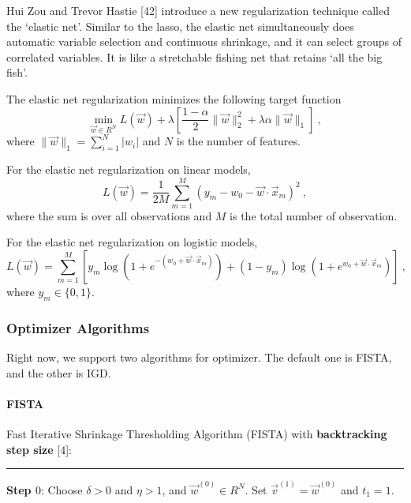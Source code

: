 Hui Zou and Trevor Hastie [42] introduce a new regularization
technique called the `elastic net'. Similar to the lasso, the elastic net
simultaneously does automatic variable selection and continuous
shrinkage, and it can select groups of correlated variables. It is like a
stretchable fishing net that retains `all the big fish'.

The elastic net regularization minimizes the following target function
\begin{equation} \label{eq:target}
\min_{\vec{w} \in R^N}L(\vec{w}) + \lambda \left[\frac{1-\alpha}{2}\|\vec{w}\|_2^2 +
  \lambda\alpha \|\vec{w}\|_1\right]\ ,
\end{equation}
where $\|\vec{w}\|_1 = \sum_{i=1}^N|w_i|$ and $N$ is the number of features.

For the elastic net regularization on linear models,
\begin{equation}
L(\vec{w}) = \frac{1}{2M}\sum_{m=1}^M\left(y_m - w_0 - \vec{w} \cdot
  \vec{x}_m\right)^2\ ,
\end{equation}
where the sum is over all observations and $M$ is the total number of
observation.

For the elastic net regularization on logistic models,
\begin{equation}
L(\vec{w}) = \sum_{m=1}^M\left[y_m \log\left(1 + e^{-(w_0 +
      \vec{w}\cdot\vec{x}_m)}\right) + (1-y_m) \log\left(1 + e^{w_0 +
      \vec{w}\cdot\vec{x}_m}\right)\right]\ ,
\end{equation}
where $y_m \in \{0,1\}$.

\subsubsection{Optimizer Algorithms}
Right now, we support two algorithms for optimizer. The default one is
FISTA, and the other is IGD.

\paragraph{FISTA}

Fast Iterative Shrinkage Thresholding Algorithm (FISTA) with {\bf
  backtracking step size} [4]:
\vspace{0.2in}
\hrule
\vspace{0.2in}
{\bf Step $0$}: Choose $\delta>0$ and $\eta > 1$, and
$\vec{w}^{(0)} \in R^N$. Set $\vec{v}^{(1)}=\vec{w}^{(0)}$ and
$t_1=1$.

